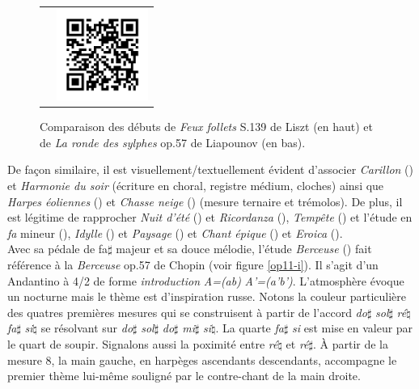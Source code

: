 \begin{figure}[!p]
\begin{bigcenter}
\begin{tabular}{lr}
      &
      \includegraphics[width=3cm, keepaspectratio]{op11-xi-qr.png}
    \end{tabular}
  \end{bigcenter}
  \caption{\label{op11-xi}Comparaison des débuts de \emph{Feux follets} S.139 de Liszt (en haut) et de \emph{La ronde des sylphes} op.57 de Liapounov (en bas).}
\end{figure}

De façon similaire, il est visuellement/textuellement évident d'associer \emph{Carillon} () et \emph{Harmonie du soir} (écriture en choral, registre médium, cloches) ainsi que \emph{Harpes éoliennes} () et \emph{Chasse neige} () (mesure ternaire et trémolos). De plus, il est légitime de rapprocher \emph{Nuit d'été} () et \emph{Ricordanza} (), \emph{Tempête} () et l'étude en \emph{fa} mineur (), \emph{Idylle} () et \emph{Paysage} () et \emph{Chant épique} () et \emph{Eroica} ().\\

Avec sa pédale de fa$\sharp$ majeur et sa douce mélodie, l'étude \emph{Berceuse} () fait référence à la \emph{Berceuse} op.57 de Chopin (voir figure \ref{op11-i}). Il s'agit d'un Andantino à 4/2 de forme \emph{introduction} \emph{A=(ab)} \emph{A'=(a'b')}. L’atmosphère évoque un nocturne mais le thème est d'inspiration russe. Notons la couleur particulière des quatres premières mesures qui se construisent à partir de l'accord \emph{do}$\sharp$ \emph{sol}$\sharp$ \emph{ré}$\natural$ \emph{fa}$\sharp$ \emph{si}$\natural$ se résolvant sur \emph{do}$\sharp$ \emph{sol}$\sharp$ \emph{do}$\sharp$ \emph{mi}$\sharp$ \emph{si}$\natural$. La quarte \emph{fa}$\sharp$ \emph{si} est mise en valeur par le quart de soupir. Signalons aussi la poximité entre \emph{ré}$\natural$ et \emph{ré}$\sharp$. À partir de la mesure 8, la main gauche, en harpèges ascendants descendants, accompagne le premier thème lui-même souligné par le contre-chant de la main droite.

